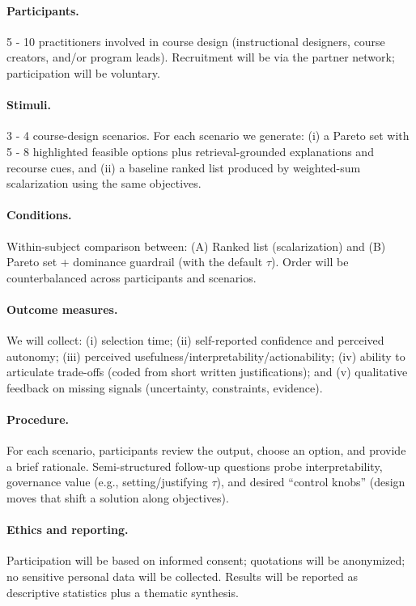 \paragraph{Participants.} 5 - 10 practitioners involved in course design (instructional designers, course creators, and/or program leads). Recruitment will be via the partner network; participation will be voluntary.

\paragraph{Stimuli.} 3 - 4 course-design scenarios. For each scenario we generate: (i) a Pareto set with 5 - 8 highlighted feasible options plus retrieval-grounded explanations and recourse cues, and (ii) a baseline ranked list produced by weighted-sum scalarization using the same objectives.

\paragraph{Conditions.} Within-subject comparison between:
(A) {Ranked list (scalarization)} and
(B) {Pareto set + dominance guardrail} (\MAPE with the default $\tau$).
Order will be counterbalanced across participants and scenarios.

\paragraph{Outcome measures.} We will collect:
(i) selection time; (ii) self-reported confidence and perceived autonomy; (iii) perceived usefulness/interpretability/actionability; (iv) ability to articulate trade-offs (coded from short written justifications); and (v) qualitative feedback on missing signals (uncertainty, constraints, evidence).

\paragraph{Procedure.} For each scenario, participants review the output, choose an option, and provide a brief rationale. Semi-structured follow-up questions probe interpretability, governance value (e.g., setting/justifying $\tau$), and desired ``control knobs'' (design moves that shift a solution along objectives).

\paragraph{Ethics and reporting.} Participation will be based on informed consent; quotations will be anonymized; no sensitive personal data will be collected. Results will be reported as descriptive statistics plus a thematic synthesis.

